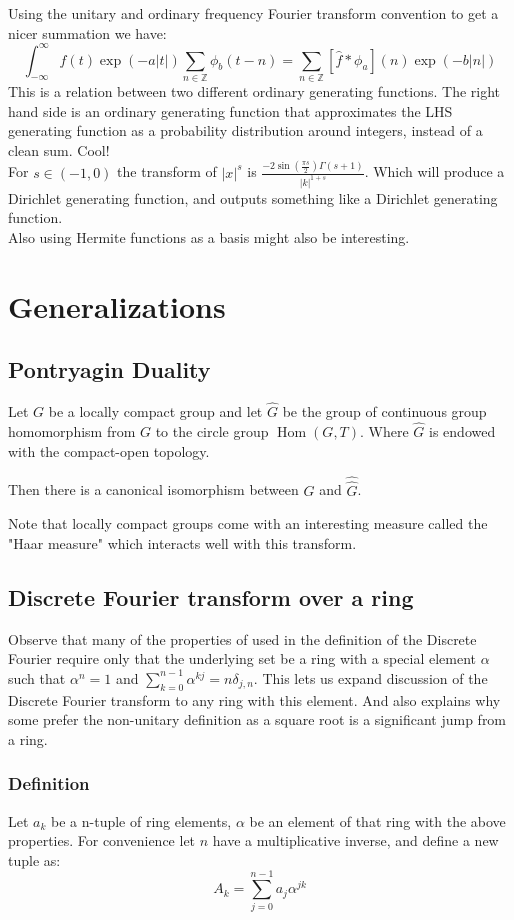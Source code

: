 \documentclass[12pt]{report}
\DeclareMathOperator{\Hom}{Hom}
\begin{document}
Using the unitary and ordinary frequency Fourier transform convention to get a nicer summation we have:
\[\int_{-\infty}^{\infty}f(t)\exp(-a|t|)\sum_{n\in\mathbb{Z}}\phi_b(t-n) = \sum_{n\in\mathbb{Z}}[\hat{f}\ast\phi_a](n)\exp(-b|n|)\]
This is a relation between two different ordinary generating functions.
The right hand side is an ordinary generating function that approximates the LHS generating function as a probability distribution around integers, instead of a clean sum. Cool!
\\

For $s \in (-1,0)$ the transform of $|x|^s$  is $\frac{-2\sin(\frac{\pi s}{2})\Gamma(s+1)}{|k|^{1+s}}$.
Which will produce a Dirichlet generating function, and outputs something like a Dirichlet generating function.
\\

Also using Hermite functions as a basis might also be interesting.

\chapter{Generalizations}
\section{Pontryagin Duality}
Let $G$ be a locally compact group and let $\hat{G}$ be the group of continuous group homomorphism from $G$ to the circle group $\Hom(G,T)$. Where $\hat{G}$ is endowed with the compact-open topology.

Then there is a canonical isomorphism between $G$ and $\hat{\hat{G}}$.

Note that locally compact groups come with an interesting measure called the "Haar measure" which interacts well with this transform.

\section{Discrete Fourier transform over a ring}
\label{sec:ring}
Observe that many of the properties of used in the definition of the Discrete Fourier require only that the underlying set be a ring with a special element $\alpha$ such that $\alpha^n = 1$ and $\sum_{k=0}^{n-1}\alpha^{kj} = n\delta_{j,n}$.
This lets us expand discussion of the Discrete Fourier transform to any ring with this element.
And also explains why some prefer the non-unitary definition as a square root is a significant jump from a ring.

\subsection{Definition}
Let $a_k$ be a n-tuple of ring elements, $\alpha$ be an element of that ring with the above properties. 
For convenience let $n$ have a multiplicative inverse, and define a new tuple as:
\[A_k = \sum_{j=0}^{n-1}a_j\alpha^{jk}\]
\end{document}
